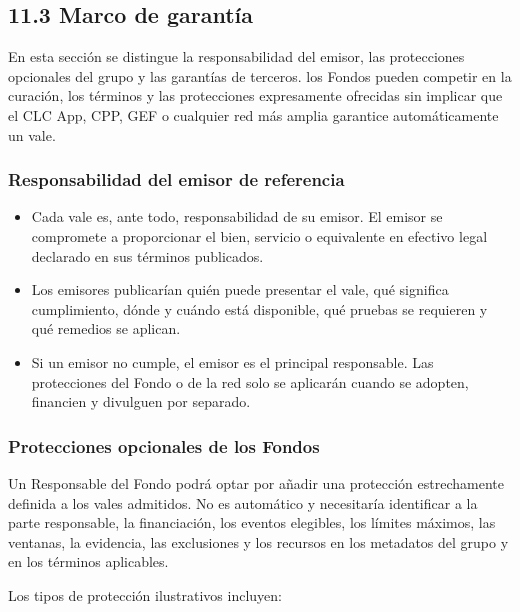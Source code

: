 \documentclass[11pt]{article}
\begin{document}
\subsection*{11.3 Marco de garantía}

En esta sección se distingue la responsabilidad del emisor, las protecciones opcionales del grupo y las garantías de terceros. los Fondos pueden competir en la curación, los términos y las protecciones expresamente ofrecidas sin implicar que el CLC App, CPP, GEF o cualquier red más amplia garantice automáticamente un vale.

\subsubsection*{Responsabilidad del emisor de referencia}

\begin{itemize}[leftmargin=*]
\item Cada vale es, ante todo, responsabilidad de su emisor. El emisor se compromete a proporcionar el bien, servicio o equivalente en efectivo legal declarado en sus términos publicados.
\item Los emisores publicarían quién puede presentar el vale, qué significa cumplimiento, dónde y cuándo está disponible, qué pruebas se requieren y qué remedios se aplican.
\item Si un emisor no cumple, el emisor es el principal responsable. Las protecciones del Fondo o de la red solo se aplicarán cuando se adopten, financien y divulguen por separado.
\end{itemize}
\subsubsection*{Protecciones opcionales de los Fondos}

Un Responsable del Fondo podrá optar por añadir una protección estrechamente definida a los vales admitidos. No es automático y necesitaría identificar a la parte responsable, la financiación, los eventos elegibles, los límites máximos, las ventanas, la evidencia, las exclusiones y los recursos en los metadatos del grupo y en los términos aplicables.

Los tipos de protección ilustrativos incluyen:
\end{document}
